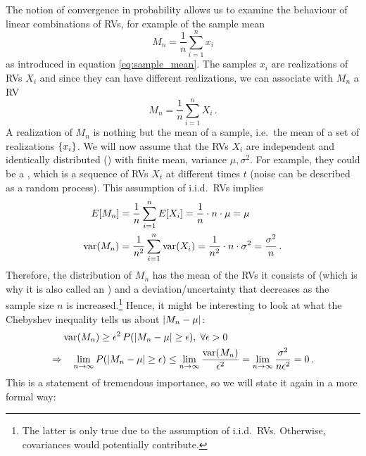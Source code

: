 The notion of convergence in probability allows us to examine the behaviour of linear combinations of RVs, for example of the sample mean
\begin{equation*}
M_n = \frac{1}{n} \sum_{i = 1}^n x_i
\end{equation*}
as introduced in equation \eqref{eq:sample_mean}. The samples $x_i$ are realizations of RVs $X_i$ and since they can have different realizations, we can associate with $M_n$ a RV
\begin{equation}
M_n = \frac{1}{n} \sum_{i = 1}^n X_i \, .
\end{equation}
A realization of $M_n$ is nothing but the mean of a sample, i.e.~the mean of a set of realizations $\qty{x_i}$. We will now assume that the RVs $X_i$ are independent and identically distributed () with finite mean, variance $\mu, \sigma^2$. For example, they could be a , which is a sequence of RVs $X_t$ at different times $t$ (noise can be described as a random process). This assumption of i.i.d.~RVs implies
\begin{align}
E[M_n] &= \frac{1}{n} \sum_{i = 1}^n E[X_i] = \frac{1}{n} \cdot n \cdot \mu = \mu
\\
\operatorname{var}(M_n) &= \frac{1}{n^2} \sum_{i = 1}^n \operatorname{var}(X_i) = \frac{1}{n^2} \cdot n \cdot \sigma^2 = \frac{\sigma^2}{n} \, .
\end{align}
Therefore, the distribution of $M_n$ has the mean of the RVs it consists of (which is why it is also called an ) and a deviation/uncertainty that decreases as the sample size $n$ is increased.\footnote{The latter is only true due to the assumption of i.i.d.~RVs. Otherwise, covariances would potentially contribute.} Hence, it might be interesting to look at what the Chebyshev inequality tells us about $\abs{M_n - \mu}$:
\begin{align}
&\operatorname{var}(M_n) \geq \epsilon^2 \, P\qty(\abs{M_n - \mu} \geq \epsilon), \; \forall \epsilon > 0
\notag\\
\Rightarrow & \quad \lim_{n \rightarrow \infty} P\qty(\abs{M_n - \mu} \geq \epsilon) \leq \lim_{n \rightarrow \infty} \frac{\operatorname{var}(M_n)}{\epsilon^2} = \lim_{n \rightarrow \infty} \frac{\sigma^2}{n \epsilon^2} = 0 \, .
\end{align}
This is a statement of tremendous importance, so we will state it again in a more formal way:
